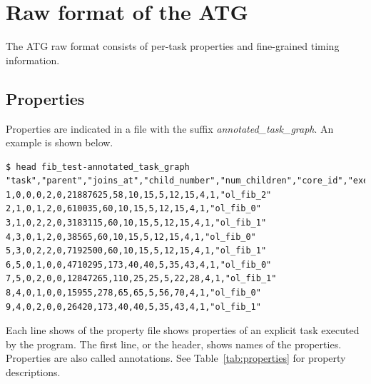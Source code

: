 \documentclass[11pt,a4paper,notitlepage]{article}
\begin{document}
\section{Raw format of the ATG}
The ATG raw format consists of per-task properties and fine-grained timing information.

\subsection{Properties}
Properties are indicated in a file with the suffix \textit{annotated\_task\_graph}. An example is shown below.

\begin{lstlisting}[style=BashInputStyle]
$ head fib_test-annotated_task_graph
"task","parent","joins_at","child_number","num_children","core_id","exec_cycles","ins_count","stack_read","stack_write","mem_fp","ccr","clr","mem_read","mem_write","name"
1,0,0,0,2,0,21887625,58,10,15,5,12,15,4,1,"ol_fib_2"
2,1,0,1,2,0,610035,60,10,15,5,12,15,4,1,"ol_fib_0"
3,1,0,2,2,0,3183115,60,10,15,5,12,15,4,1,"ol_fib_1"
4,3,0,1,2,0,38565,60,10,15,5,12,15,4,1,"ol_fib_0"
5,3,0,2,2,0,7192500,60,10,15,5,12,15,4,1,"ol_fib_1"
6,5,0,1,0,0,4710295,173,40,40,5,35,43,4,1,"ol_fib_0"
7,5,0,2,0,0,12847265,110,25,25,5,22,28,4,1,"ol_fib_1"
8,4,0,1,0,0,15955,278,65,65,5,56,70,4,1,"ol_fib_0"
9,4,0,2,0,0,26420,173,40,40,5,35,43,4,1,"ol_fib_1"
\end{lstlisting}

Each line shows of the property file shows properties of an explicit task executed by the program.
The first line, or the header, shows names of the properties. 
Properties are also called annotations.
See Table~\ref{tab:properties} for property descriptions.
\end{document}
